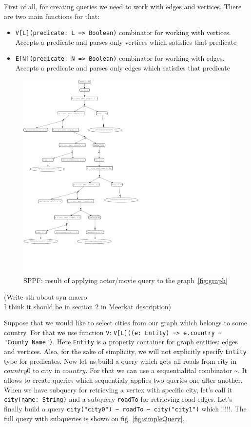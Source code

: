 First of all, for creating queries we need to work with edges and vertices.
There are two main functions for that:
\begin{itemize}
    \item \lstinline{V[L](predicate: L => Boolean)} combinator for working with vertices. Accepts a predicate and parses only vertices which satisfies that predicate
    \item \lstinline{E[N](predicate: N => Boolean)} combinator for working with edges. Accepts a predicate and parses only edges which satisfies that predicate  
\end{itemize}

\begin{figure}[h]
\includegraphics[scale=0.38]{sppf}
\caption{SPPF: result of applying actor/movie query to the graph~\ref{fig:graph}}
\label{fig:sppf}
\end{figure}

(Write sth about syn macro \\ I think it should be in section 2 in Meerkat description)


Suppose that we would like to select cities from our graph which belongs to some country. 
For that we use function \lstinline{V}: \lstinline{V[L]((e: Entity) => e.country = "County Name")}.
Here \lstinline{Entity} is a property container for graph entities: edges and vertices. 
Also, for the sake of simplicity, we will not explicitly specify \lstinline{Entity} type for predicates. 
Now let us build a query which gets all roads from city in $country0$ to city in $country$. 
For that we can use a sequentialital combinator \lstinline{~}. 
It allows to create queries which sequentialy applies two queries one after another. 
When we have subquery for retrieving a vertex with specific city, let's call it \lstinline{city(name: String)} and a subquery \lstinline{roadTo} for retrieving road edges. 
Let's finally build a query \lstinline{city("city0") ~ roadTo ~ city("city1")} which !!!!!.
The full query with subqueries is shown on fig. \ref{fig:simpleQuery}.

